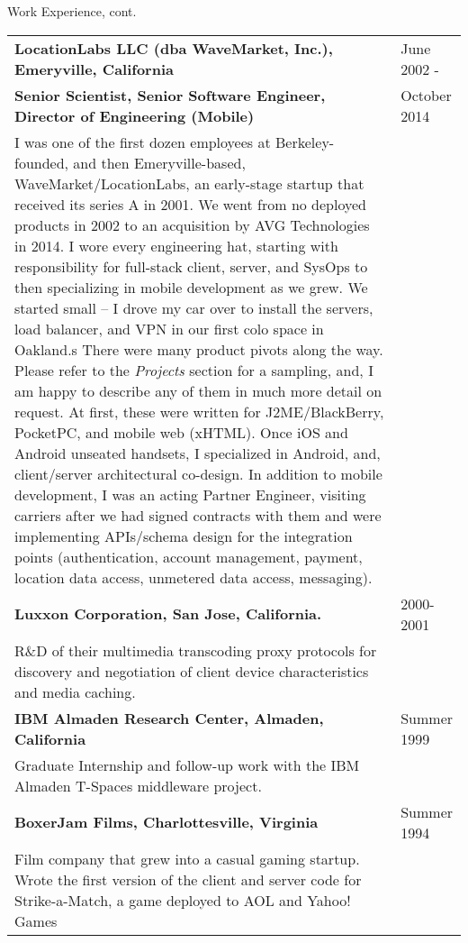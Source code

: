 \newpage
\begin{bf} \large
Work Experience, cont.
\end{bf}
\medskip

\begin{tabular}{p{5.2in}@{\hspace{1.5cm}}l}
	  
	\bf  LocationLabs LLC (dba WaveMarket, Inc.), Emeryville, California    & June 2002 -  \\
	\bf  Senior Scientist, Senior Software Engineer, Director of Engineering (Mobile) & October 2014 \\[4pt]
	
	   I was one of the first dozen employees at Berkeley-founded, and then Emeryville-based, 
	   WaveMarket/LocationLabs,
	   an early-stage startup that received its series A in 2001.
	   We went from no deployed products in 2002 to an
	   acquisition by AVG Technologies in 2014.  I wore every engineering hat, starting with responsibility
	   for full-stack client, server, and SysOps to
	   then specializing in mobile development as we grew.  
	   We started small -- 
	   I drove my car over to install the servers, load balancer, and VPN in our first colo space in Oakland.s
	   There were many product pivots along the way. Please refer to the {\it Projects} section for a sampling, 
	   and, I am happy to describe any of them in much more detail on request.
	   At first, these were written for J2ME/BlackBerry, PocketPC, and mobile web (xHTML).
	   Once iOS and Android unseated handsets, 
	   I specialized in Android, and, client/server architectural co-design.  In addition to mobile development, I was an acting
	   Partner Engineer, visiting carriers after we had signed contracts
	   with them and were implementing APIs/schema design for the integration points
	    (authentication, account management, payment, location data access, unmetered data access, messaging). \\[9pt]
       	  
    \bf Luxxon Corporation, San Jose, California. & 2000-2001 \\[3pt]
       R\&D of their multimedia transcoding proxy
       protocols for discovery and negotiation of client
       device characteristics and media caching. \\[9pt]

    \bf IBM Almaden Research Center, 
          Almaden, California                         & Summer 1999 \\[3pt]
       Graduate Internship and follow-up work with
       the IBM Almaden T-Spaces middleware project. \\[9pt]

    \bf BoxerJam Films, 
         Charlottesville, Virginia                        & Summer 1994 \\[3pt]
       Film company that grew into a casual gaming startup. 
       Wrote the first version of the client and server code for Strike-a-Match, 
       a game deployed to AOL and Yahoo! Games \\[9pt]

\end{tabular}


